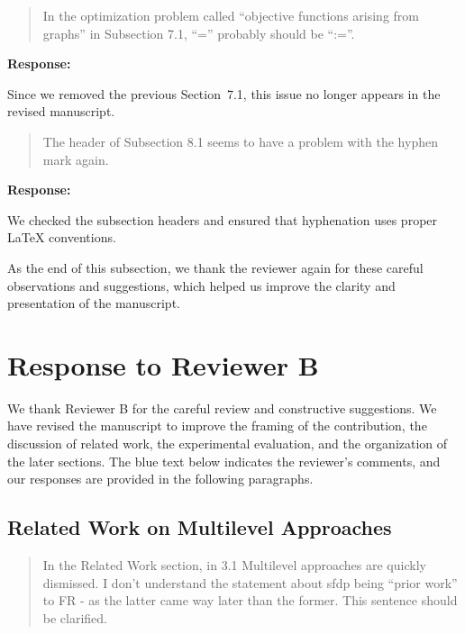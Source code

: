 \documentclass[11pt]{article}
\newcommand{\reviewercomment}[1]{%
  \begin{quote}
  \color{blue}
  #1
  \end{quote}
}
\newenvironment{response}{%
  \noindent\textbf{Response:}%
}{%
  \medskip
}
\begin{document}
\reviewercomment{
  In the optimization problem called ``objective functions arising from graphs'' in Subsection 7.1, ``='' probably should be ``:=''.
}

\begin{response}
  Since we removed the previous Section~7.1, this issue no longer appears in the revised manuscript.
\end{response}

\reviewercomment{
  The header of Subsection 8.1 seems to have a problem with the hyphen mark again.
}

\begin{response}
  We checked the subsection headers and ensured that hyphenation uses proper LaTeX conventions.

  As the end of this subsection, we thank the reviewer again for these careful observations and suggestions, which helped us improve the clarity and presentation of the manuscript.
\end{response}


\bigskip

\section{Response to Reviewer B}

We thank Reviewer B for the careful review and constructive suggestions.
We have revised the manuscript to improve the framing of the contribution, the discussion of related work, the experimental evaluation, and the organization of the later sections.
The blue text below indicates the reviewer's comments, and our responses are provided in the following paragraphs.

\subsection{Related Work on Multilevel Approaches}

\reviewercomment{
  In the Related Work section, in 3.1 Multilevel approaches are quickly dismissed.
  I don't understand the statement about sfdp being ``prior work'' to FR - as the latter came way later than the former.
  This sentence should be clarified.
}
\end{document}

